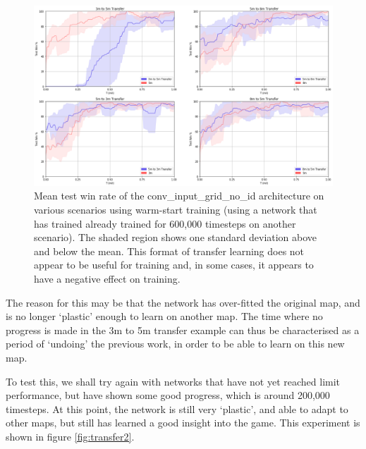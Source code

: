 \begin{figure}[h]
    \centering
    \hbox{\hspace{-5em}\includegraphics[width=1.2\textwidth]{images/graphs/6.png}}
    \caption{Mean test win rate of the conv\_input\_grid\_no\_id architecture on various scenarios using warm-start training (using a network that has trained already trained for 600,000 timesteps on another scenario). The shaded region shows one standard deviation above and below the mean. This format of transfer learning does not appear to be useful for training and, in some cases, it appears to have a negative effect on training. }
    \label{fig:transfer6}
\end{figure}


The reason for this may be that the network has over-fitted the original map, and is no longer `plastic' enough to learn on another map. The time where no progress is made in the 3m to 5m transfer example can thus be characterised as a period of `undoing' the previous work, in order to be able to learn on this new map.

To test this, we shall try again with networks that have not yet reached limit performance, but have shown some good progress, which is around 200,000 timesteps. At this point, the network is still very `plastic', and able to adapt to other maps, but still has learned a good insight into the game. This experiment is shown in figure \ref{fig:transfer2}.


